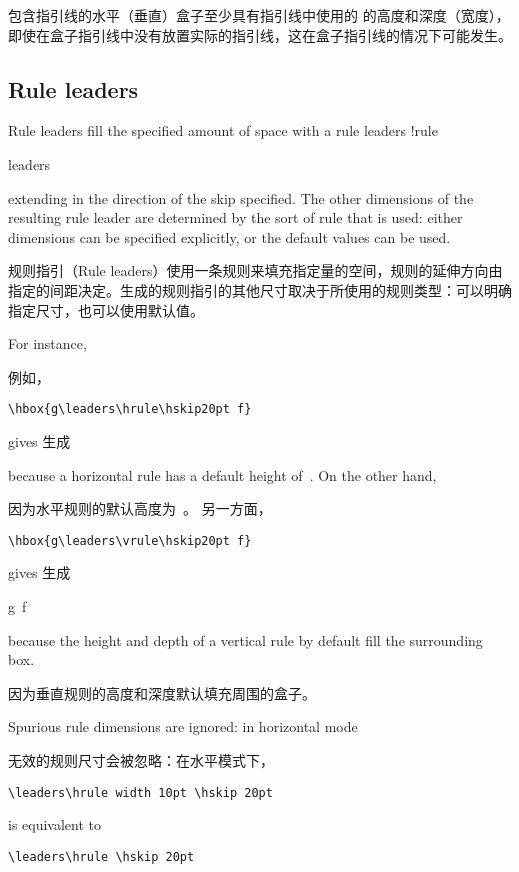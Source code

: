 包含指引线的水平（垂直）盒子至少具有指引线中使用的  的高度和深度（宽度），即使在盒子指引线中没有放置实际的指引线，这在盒子指引线的情况下可能发生。



\subsection{Rule leaders}

Rule leaders fill the specified amount of space with a rule
\term leaders !rule\par\cstoidx leaders\par
extending in the direction of the skip specified.
The other dimensions of the resulting rule leader
are determined by the sort of rule that is used:
either dimensions can be specified explicitly, or
the default values can be used.

规则指引（Rule leaders）使用一条规则来填充指定量的空间，规则的延伸方向由指定的间距决定。生成的规则指引的其他尺寸取决于所使用的规则类型：可以明确指定尺寸，也可以使用默认值。

For instance, 

例如，
\begin{verbatim}
\hbox{g\leaders\hrule\hskip20pt f}
\end{verbatim}
gives 生成
because a horizontal rule has a default height of~\n{.4pt}.
On the other hand,

因为水平规则的默认高度为~\n{.4pt}。
另一方面，
\begin{verbatim}
\hbox{g\leaders\vrule\hskip20pt f}
\end{verbatim}
gives 生成\begin{disp}\leavevmode\hbox{g\leaders\vrule\hskip20pt f}\end{disp}
because the height and depth of a vertical rule
by default fill the surrounding box.

因为垂直规则的高度和深度默认填充周围的盒子。

Spurious rule dimensions are ignored: in horizontal mode

无效的规则尺寸会被忽略：在水平模式下，
\begin{verbatim}
\leaders\hrule width 10pt \hskip 20pt
\end{verbatim}
is equivalent to
\begin{verbatim}
\leaders\hrule \hskip 20pt
\end{verbatim}

